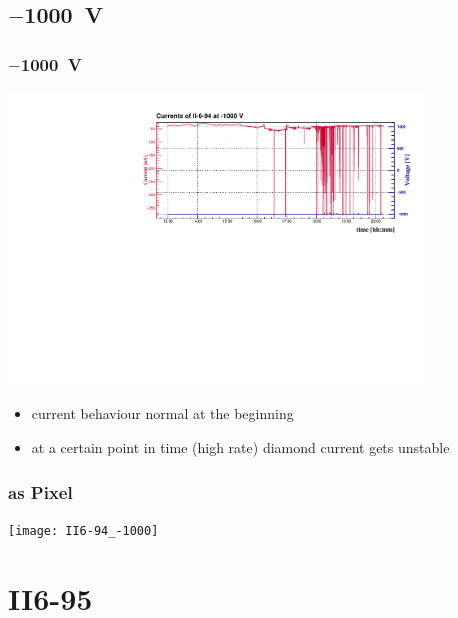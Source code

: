 \documentclass[9pt]{beamer}
\begin{document}
\subsection{$-$\SI{1000}{V}}
\begin{frame}
	\frametitle{$-$\SI{1000}{V}}
	\vspace*{-15pt}
	\begin{center}
		\includegraphics[angle=270, width=11cm]{II-6-94_-1000}
	\end{center}
	\begin{itemize}
		\item current behaviour normal at the beginning
		\item at a certain point in time (high rate) diamond current gets unstable
	\end{itemize}
\end{frame}
\begin{frame}
	\frametitle{as Pixel}
	\vspace*{-15pt}
	\begin{center}
		\texttt{[image: II6-94\_-1000]}
	\end{center}
\end{frame}
\section{II6-95}
\end{document}
